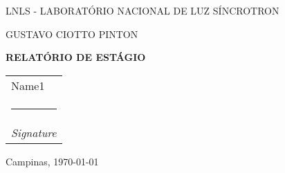 \newcommand{\namesigdate}[2][5cm]{%
  \begin{tabular}{@{}p{#1}}
    #2 \\[2\normalbaselineskip] \hrule \\[0pt]
    {\small \textit{Signature}} \\[2\normalbaselineskip]
  \end{tabular}
}

\begin{center}


\vspace*{12pt}

LNLS - LABORATÓRIO NACIONAL DE LUZ SÍNCROTRON

\vspace*{.30\textheight}

{\Large GUSTAVO CIOTTO PINTON}

\vspace*{72pt}
\textbf{\Large RELATÓRIO DE ESTÁGIO} \\ \vspace{12pt}


\namesigdate{Name1}



 
Campinas, \today

\end{center}

\newpage 
